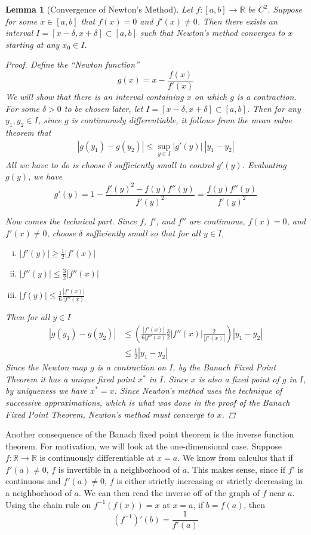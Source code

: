 \documentclass[12pt]{amsart}         %
\newtheorem{lemma}{Lemma}[section]
\theoremstyle{remark}
\newcommand{\R}{\mathbb{R}}
\begin{document}
\begin{lemma}[Convergence of Newton's Method]
Let $f: [a, b] \rightarrow \R$ be $C^2$. Suppose for some $x \in [a, b]$ that $f(x) = 0$ and $f'(x) \neq 0$. Then there exists an interval $I = [x - \delta, x + \delta] \subset [a, b]$ such that Newton's method converges to $x$ starting at any $x_0 \in I$.
\begin{proof}
Define the ``Newton function''
\[
g(x) = x - \frac{f(x)}{f'(x)}
\]
We will show that there is an interval containing $x$ on which $g$ is a contraction. For some $\delta > 0$ to be chosen later, let $I = [x - \delta, x + \delta ] \subset [a, b]$. Then for any $y_1, y_2 \in I$, since $g$ is continuously differentiable, it follows from the mean value theorem that
\begin{align*}
|g(y_1) - g(y_2)| \leq \sup_{y \in I} |g'(y)| \: |y_1 - y_2|
\end{align*}
All we have to do is choose $\delta$ sufficiently small to control $g'(y)$. Evaluating $g(y)$, we have
\[
g'(y) = 1 - \frac{f'(y)^2 - f(y)f''(y)}{f'(y)^2} = \frac{f(y)f''(y)}{f'(y)^2}
\]

Now comes the technical part. Since $f$, $f'$, and $f''$ are continuous, $f(x) = 0$, and $f'(x) \neq 0$, choose $\delta$ sufficiently small so that for all $y \in I$,
\begin{enumerate}[(i)]
	\item $|f'(y)| \geq \frac{1}{2}|f'(x)|$ 
	\item $|f''(y)| \leq \frac{3}{2}|f''(x)|$
	\item $|f(y)| \leq \frac{1}{6} \frac{|f'(x)|}{ |f''(x)}$
\end{enumerate}
Then for all $y \in I$
\begin{align*}
|g(y_1) - g(y_2)| &\leq 
\left( \frac{|f'(x)|}{6 |f''(x)} \frac{3}{2}|f''(x)| \frac{2}{|f'(x)|}\right)|y_1 - y_2| \\ 
&\leq \frac{1}{2}|y_1 - y_2| 
\end{align*}
Since the Newton map $g$ is a contraction on $I$, by the Banach Fixed Point Theorem it has a unique fixed point $x^*$ in $I$. Since $x$ is also a fixed point of $g$ in $I$, by uniqueness we have $x^* = x$. Since Newton's method uses the technique of successive approximations, which is what was done in the proof of the Banach Fixed Point Theorem, Newton's method must converge to $x$.
\end{proof}
\end{lemma}

Another consequence of the Banach fixed point theorem is the inverse function theorem. For motivation, we will look at the one-dimensional case. Suppose $f: \R \rightarrow \R$ is continuously differentiable at $x = a$. We know from calculus that if $f'(a) \neq 0$, $f$ is invertible in a neighborhood of $a$. This makes sense, since if $f'$ is continuous and $f'(a) \neq 0$, $f$ is either strictly increasing or strictly decreasing in a neighborhood of $a$. We can then read the inverse off of the graph of $f$ near $a$. Using the chain rule on $f^{-1}(f(x)) = x$ at $x = a$, if $b = f(a)$, then
\[
(f^{-1})'(b) = \frac{1}{f'(a)}
\]
\end{document}
